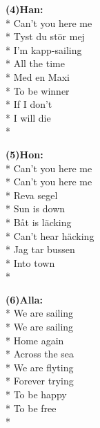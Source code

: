 \begin{SongText}[Sailing]
\begin{multicols}{2}
        \begin{SongVerse}
            \textbf{(4)Han:}\\*%
            Can't you here me\\*%
            Tyst du stör mej\\*%
            I'm kapp-sailing\\*%
            All the time\\*%
            Med en Maxi\\*%
            To be winner\\*%
            If I don't\\*%
            I will die\\*%
        \end{SongVerse}
        \begin{SongVerse}
            \textbf{(5)Hon:}\\*%
            Can't you here me\\*%
            Can't you here me\\*%
            Reva segel\\*%
            Sun is down\\*%
            Båt is läcking\\*%
            Can't hear häcking\\*%
            Jag tar bussen\\*%
            Into town\\*%
        \end{SongVerse}
        \begin{SongVerse}
            \textbf{(6)Alla:}\\*%
            We are sailing\\*%
            We are sailing\\*%
            Home again\\*%
            Across the sea\\*%
            We are flyting\\*%
            Forever trying\\*%
            To be happy\\*%
            To be free\\*%
        \end{SongVerse}
    \end{multicols}
\end{SongText}
